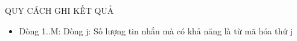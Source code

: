 QUY CÁCH GHI KẾT QUẢ
\begin{itemize}
	\item     Dòng 1..M: Dòng j: Số lượng tin nhắn mà có khả năng là từ mã hóa thứ j   
\end{itemize}